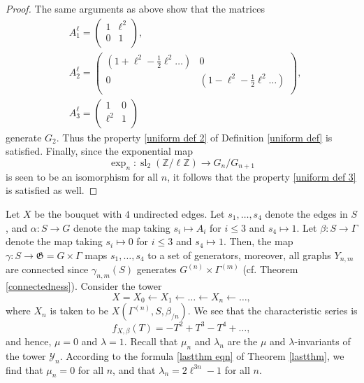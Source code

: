 \documentclass[11pt]{amsart}
\numberwithin{equation}{section}
\theoremstyle{remark}
\newcommand{\Y}{\mathcal{Y}}
\newcommand{\G}{\mathfrak{G}}
\newcommand{\Z}{\mathbb{Z}}
\newcommand{\op}[1]{\operatorname{#1}}
\newcommand\mtx[4] { \left( {\begin{array}{cc}
 #1 & #2 \\
 #3 & #4 \\
 \end{array} } \right)}
\begin{document}
\begin{proof}
\par The same arguments as above show that the matrices
\[\begin{split}& A_1^\ell=\mtx{1}{\ell^2}{0}{1},\\
& A_2^{\ell}=\mtx{(1+\ell^2-\frac{1}{2}\ell^2\dots)}{0}{0}{(1-\ell^2-\frac{1}{2}\ell^2\dots)},\\
& A_3^\ell=\mtx{1}{0}{\ell^2}{1}
\end{split}\]
generate $G_2$. Thus the property \eqref{uniform def 2} of Definition \ref{uniform def} is satisfied. Finally, since the exponential map 
\[\op{exp}_n: \op{sl}_2(\Z/\ell\Z)\rightarrow G_n/G_{n+1}\] is seen to be an isomorphism for all $n$, it follows that the property \eqref{uniform def 3} is satisfied as well.
\end{proof}

Let $X$ be the bouquet with $4$ undirected edges. Let $s_1, \dots, s_4$ denote the edges in $S$, and $\alpha:S\rightarrow G$ denote the map taking $s_i\mapsto A_i$ for $i\leq 3$ and $s_4\mapsto 1$. Let $\beta:S\rightarrow \Gamma$ denote the map taking $s_i\mapsto 0$ for $i\leq 3$ and $s_4\mapsto 1$. Then, the map $\gamma:S\rightarrow \G=G\times \Gamma$ maps $s_1, \dots, s_4$ to a set of generators, moreover, all graphs $Y_{n, m}$ are connected since $\gamma_{n,m}(S)$ generates $G^{(n)} \times \Gamma^{(m)}$ (cf. Theorem \ref{connectedness}). Consider the tower 
\[X=X_0\leftarrow X_1 \leftarrow \dots\leftarrow X_n\leftarrow \dots ,\]
where $X_n$ is taken to be $X(\Gamma^{(n)}, S, \beta_{/n})$. We see that the characteristic series is 
$$f_{X,\beta}(T) = -T^2+T^3-T^4+\dots,$$ 
and hence, $\mu=0$ and $\lambda=1$.  Recall that $\mu_n$ and $\lambda_n$ are the $\mu$ and $\lambda$-invariants of the tower $\Y_n$. According to the formula \eqref{lastthm eqn} of Theorem \ref{lastthm}, we find that $\mu_n=0$ for all $n$, and that $\lambda_n=2\ell^{3n}-1$ for all $n$.


\end{document}
